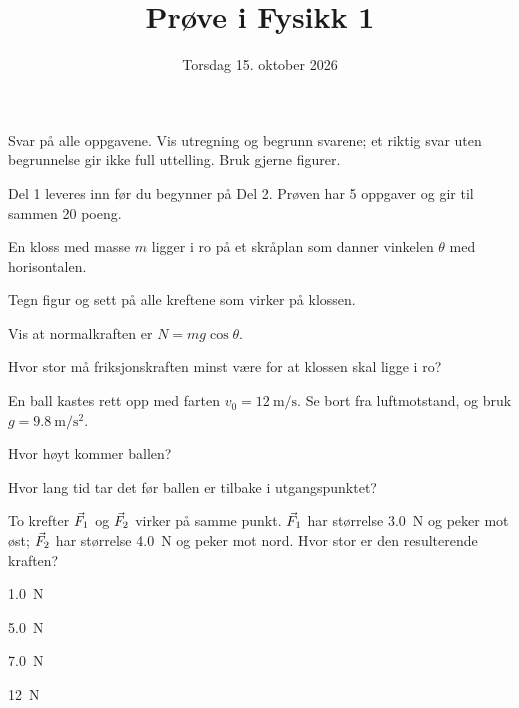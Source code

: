 \documentclass[12pt]{article}
\title{Prøve i Fysikk 1}
\date{Torsdag 15. oktober 2026}
\begin{document}
\maketitle

Svar på alle oppgavene. Vis utregning og begrunn svarene; et riktig svar uten begrunnelse gir ikke full uttelling. Bruk gjerne figurer.

Del 1 leveres inn før du begynner på Del 2. Prøven har 5 oppgaver og gir til sammen 20 poeng.


%


\begin{oppgave}
En kloss med masse $m$ ligger i ro på et skråplan som danner vinkelen $\theta$ med horisontalen.

\begin{deloppgaver}
  \item Tegn figur og sett på alle kreftene som virker på klossen.
  \item Vis at normalkraften er $N = mg\cos\theta$.
  \item Hvor stor må friksjonskraften minst være for at klossen skal ligge i ro?
\end{deloppgaver}
\end{oppgave}


\begin{oppgave}
En ball kastes rett opp med farten $v_0 = \qty{12}{\metre\per\second}$. Se bort fra luftmotstand, og bruk $g = \qty{9.8}{\metre\per\second\squared}$.

\begin{deloppgaver}
  \item Hvor høyt kommer ballen?
  \item Hvor lang tid tar det før ballen er tilbake i utgangspunktet?
\end{deloppgaver}
\end{oppgave}


\begin{oppgave}
To krefter $\vv{F}_1$ og $\vv{F}_2$ virker på samme punkt. $\vv{F}_1$ har størrelse \qty{3.0}{\newton} og peker mot øst; $\vv{F}_2$ har størrelse \qty{4.0}{\newton} og peker mot nord. Hvor stor er den resulterende kraften?
\begin{flervalg}
  \item \qty{1.0}{\newton}
  \item \qty{5.0}{\newton}
  \item \qty{7.0}{\newton}
  \item \qty{12}{\newton}
\end{flervalg}
\end{oppgave}
\end{document}
